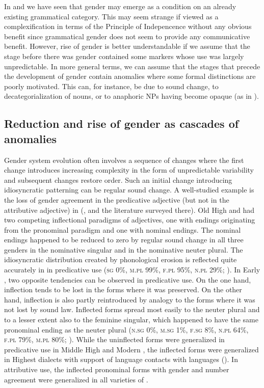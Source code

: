 \documentclass[output=collectionpaper]{langsci/langscibook}
\begin{document}
In  and  we have seen that gender may emerge as a condition on an already existing grammatical category. This may seem strange if viewed as a complexification in terms of the Principle of Indepencence without any obvious benefit since grammatical gender does not seem to provide any communicative benefit. However, rise of gender is better understandable if we assume that the stage before there was gender contained some markers whose use was largely unpredictable. In more general terms, we can assume that the stages that precede the development of gender contain anomalies where some formal distinctions are poorly motivated. This can, for instance, be due to sound change, to decategorialization of nouns, or to anaphoric NPs having become opaque (as in ).

  \subsection{Reduction and rise of gender as cascades of anomalies}
  \label{sec:WDG:10.4}

Gender system evolution often involves a sequence of changes where the first change introduces increasing complexity in the form of unpredictable variability and subsequent changes restore order. Such an initial change introducing idiosyncratic patterning can be regular sound change. A well-studied example is the loss of gender agreement in the predicative adjective (but not in the attributive adjective) in  (\citealt{Fleischer2007a}, \citealt{Fleischer2007b} and the literature surveyed there). Old High  and  had two competing inflectional paradigms of adjectives, one with endings originating from the pronominal paradigm and one with nominal endings. The nominal endings happened to be reduced to zero by regular sound change in all three genders in the nominative singular and in the nominative neuter plural. The idiosyncratic distribution created by phonological erosion is reflected quite accurately in  in predicative use (\textsc{sg} 0\%, \textsc{m.pl} 99\%, \textsc{f.pl} 95\%, \textsc{n.pl} 29\%; \citealt[Table~9]{Fleischer2007a}). In Early , two opposite tendencies can be observed in predicative use. On the one hand, inflection tends to be lost in the forms where it was preserved. On the other hand, inflection is also partly reintroduced by analogy to the forms where it was not lost by sound law. Inflected forms spread most easily to the neuter plural and to a lesser extent also to the feminine singular, which happened to have the same pronominal ending as the neuter plural (\textsc{n.sg} 0\%, \textsc{m.sg} 1\%, \textsc{f.sg} 8\%, \textsc{n.pl} 64\%, \textsc{f.pl} 79\%, \textsc{m.pl} 80\%; \citealt[Table~11]{Fleischer2007a}). While the uninflected forms were generalized in predicative use in Middle High  and Modern , the inflected forms were generalized in Highest  dialects with support of language contacts with  languages (\citealt{Fleischer2007b}). In attributive use, the inflected pronominal forms with gender and number agreement were generalized in all varieties of .
\end{document}

